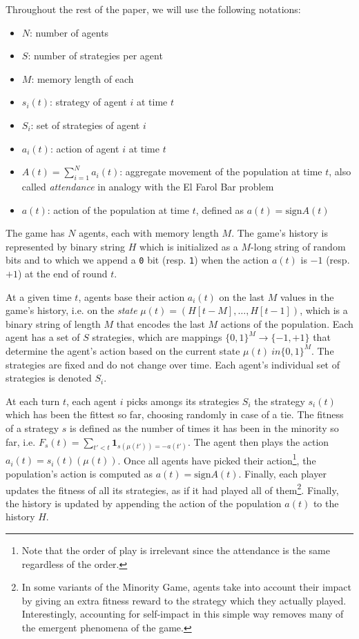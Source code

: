 \documentclass[a4paper, amsfonts, amssymb, amsmath, reprint, showkeys, nofootinbib, twoside]{revtex4-1}
\begin{document}
Throughout the rest of the paper, we will use the following notations:
\begin{itemize}
    \item $N$: number of agents
    \item $S$: number of strategies per agent
    \item $M$: memory length of each
    \item $s_i(t)$: strategy of agent $i$ at time $t$
    \item $S_i$: set of strategies of agent $i$
    \item $a_i(t)$: action of agent $i$ at time $t$
    \item $A(t) = \sum_{i=1}^N a_i(t)$: aggregate movement of the population at time $t$, also called \textit{attendance} in analogy with the El Farol Bar problem
    \item $a(t)$: action of the population at time $t$, defined as $a(t) = \text{sign}A(t)$
\end{itemize}

The game has $N$ agents, each with memory length $M$. The game's history is represented by binary string $H$ which is initialized as a $M$-long string of random bits and to which we append a \texttt{0} bit (resp. \texttt{1}) when the action $a(t)$ is $-1$ (resp. $+1$) at the end of round $t$.

At a given time $t$, agents base their action $a_i(t)$ on the last $M$ values in the game's history, i.e. on the \textit{state} $\mu(t) = (H[t-M], \ldots, H[t-1])$, which is a binary string of length $M$ that encodes the last $M$ actions of the population. Each agent has a set of $S$ strategies, which are mappings $\{0, 1\}^M \to \{-1, +1\}$ that determine the agent's action based on the current state $\mu(t) \ in \{0, 1\}^M$. The strategies are fixed and do not change over time. Each agent's individual set of strategies is denoted $S_i$.

At each turn $t$, each agent $i$ picks amongs its strategies $S_i$ the strategy $s_i(t)$ which has been the fittest so far, choosing randomly in case of a tie. The fitness of a strategy $s$ is defined as the number of times it has been in the minority so far, i.e. $F_s(t) = \sum_{t' < t} \mathbf{1}_{s(\mu(t')) = -a(t')}$. The agent then plays the action $a_i(t) = s_i(t)(\mu(t))$. Once all agents have picked their action\footnote{Note that the order of play is irrelevant since the attendance is the same regardless of the order.}, the population's action is computed as $a(t) = \text{sign}A(t)$. Finally, each player updates the fitness of all its strategies, as if it had played all of them\footnote{In some variants of the Minority Game, agents take into account their impact by giving an extra fitness reward to the strategy which they actually played. Interestingly, accounting for self-impact in this simple way removes many of the emergent phenomena of the game.}. Finally, the history is updated by appending the action of the population $a(t)$ to the history $H$.
\end{document}
